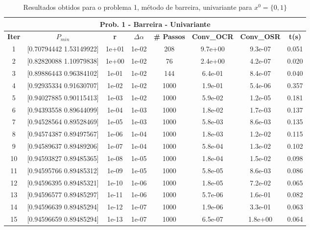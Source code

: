 \documentclass[10pt, a4paper]{article}
\begin{document}
\vspace{5mm}
\begin{table}[H]
  \begin{center}
    \begin{tabular}{c|c|c|c|c|c|c|c}
      \multicolumn{8}{c}{\textbf{Prob. 1 - Barreira - Univariante}}\\
      \hline
      \textbf{Iter} & \textbf{$P_{min}$} & \textbf{r} & $\Delta \alpha$ &\textbf{\# Passos} & \textbf{Conv\_OCR} & \textbf{Conv\_OSR} & \textbf{t(s)}\\
      \hline
        1& [0.70794442 1.53149922]& 1e+01& 1e-02 &208& 9.7e+00& 9.3e-07& 0.051    \\
        2& [0.82820088 1.10979838]& 1e+00& 1e-02 &76& 2.4e+00& 4.2e-07& 0.020\\
        3& [0.89886443 0.96384102]& 1e-01& 1e-02 &144& 6.4e-01& 8.4e-07& 0.040\\
        4& [0.92935334 0.91630707]& 1e-02& 1e-02 &1000& 1.9e-01& 5.4e-06& 0.357\\
        5& [0.94027885 0.90115413]& 1e-03& 1e-02 &1000& 5.9e-02& 1.2e-05& 0.181\\
        6& [0.94393558 0.89644099]& 1e-04& 1e-03 &1000& 1.8e-02& 1.7e-03& 0.137\\
        7& [0.94528564 0.89528469]& 1e-05& 1e-03 &1000& 5.8e-03& 8.6e-03& 0.135\\
        8& [0.94574387 0.89497567]& 1e-06& 1e-04 &1000& 1.8e-03& 1.2e-02& 0.115\\
        9& [0.94589637 0.89489206]& 1e-07& 1e-04 &1000& 5.8e-04& 1.3e-02& 0.102\\
        10& [0.94593827 0.89485365]& 1e-08& 1e-05 &1000& 1.8e-04& 1.5e-02& 0.098\\
        11& [0.94595766 0.89485312]& 1e-09& 1e-05 &1000& 5.8e-05& 8.6e-03& 0.086\\
        12& [0.94596395 0.89485321]& 1e-10& 1e-06 &1000& 1.8e-05& 7.2e-02& 0.065\\
        13& [0.94596577 0.89485297]& 1e-11& 1e-06 &1000& 5.7e-06& 1.6e-01& 0.082\\
        14& [0.94596639 0.89485294]& 1e-12& 1e-07 &1000& 1.9e-06& 3.3e-01& 0.063\\
        15& [0.94596659 0.89485294]& 1e-13& 1e-07 &1000& 6.5e-07& 1.8e+00& 0.064\\
    \end{tabular}
  \end{center}
  \caption{Resultados obtidos para o problema 1, método de barreira, univariante para $x^0=\{0,1\}$}
\end{table}
\end{document}

